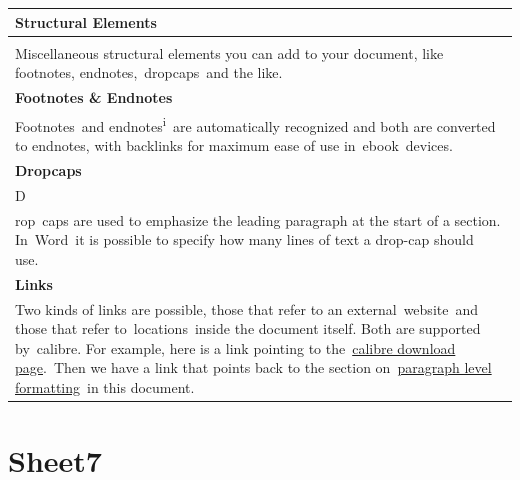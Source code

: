\documentclass[\officeparserdriver 12pt]{article}
\begin{document}
\begin{longtable}{|*{1}{>{\raggedright\arraybackslash}p{\dimexpr(\linewidth-2\tabcolsep-2\arrayrulewidth)/1\relax}|}}
\hline
\textcolor{hex365F91}{\textbf{{\fontsize{14pt}{16.8pt}\selectfont Structural Elements~}}} \\
\hline
\endhead
 \\
\hline
Miscellaneous structural elements you can add to your document, like footnotes, endnotes,~dropcaps~and the like.~~ \\
\hline
\textcolor{hex4F81BD}{\textbf{{\fontsize{13pt}{15.6pt}\selectfont Footnotes \& Endnotes~}}} \\
\hline
Footnotes\textsuperscript{{\fontsize{9.5pt}{11.4pt}\selectfont 1}}~and endnotes\textsuperscript{{\fontsize{9.5pt}{11.4pt}\selectfont i}}~are automatically recognized and both are converted to endnotes, with backlinks for maximum ease of use in~ebook~devices.~ \\
\hline
\textcolor{hex4F81BD}{\textbf{{\fontsize{13pt}{15.6pt}\selectfont Dropcaps~}}} \\
\hline
{\fontsize{58.5pt}{70.2pt}\selectfont D~} \\
\hline
rop~caps are used to emphasize the leading paragraph at the start of a section. In~Word~it is possible to specify how many lines of text a drop-cap should use.~ \\
\hline
\textcolor{hex4F81BD}{\textbf{{\fontsize{13pt}{15.6pt}\selectfont Links~}}} \\
\hline
Two kinds of links are possible, those that refer to an external~website~and those that refer to~locations~inside the document itself. Both are supported by~calibre. For example, here is a link pointing to the~\textcolor{hex0000FF}{\uline{calibre download page}}.~Then we have a link that points back to the section on~\textcolor{hex0000FF}{\uline{paragraph level formatting}}~in this document.~ \\
\hline
\end{longtable}

\section{Sheet7}
\end{document}
